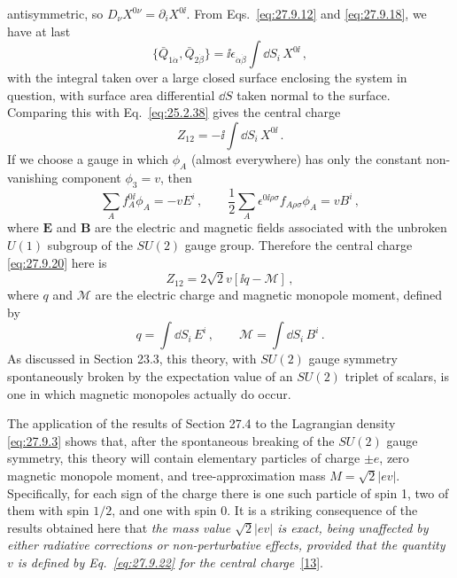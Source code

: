 antisymmetric, so \(D_\nu X^{0\nu}=\partial_iX^{0\ii}\). From
Eqs.~\eqref{eq:27.9.12} and \eqref{eq:27.9.18}, we have at last
\begin{equation}
  \{\bar Q_{1\dot\alpha},\bar Q_{2\dot\beta}\}
  =\ii\epsilon_{\dot\alpha\dot\beta}\int \dd S_i\,X^{0\ii}\,,
  \tag{27.9.19}\label{eq:27.9.19}
\end{equation}
with the integral taken over a large closed surface enclosing the system in
question, with surface area differential \(\dd S\) taken normal to the surface.
Comparing this with Eq.~\eqref{eq:25.2.38} gives the central charge
\begin{equation}
  Z_{12}=-\ii\int \dd S_i\,X^{0\ii}\,.
  \tag{27.9.20}\label{eq:27.9.20}
\end{equation}
If we choose a gauge in which \(\phi_A\) (almost everywhere) has only the
constant non-vanishing component \(\phi_3=v\), then
\begin{equation}
  \sum_Af_A^{0\ii}\phi_A=-vE^i\,,
  \qquad
  \frac12\sum_A\epsilon^{0\ii\rho\sigma}f_{A\rho\sigma}\phi_A=vB^i\,,
  \tag{27.9.21}\label{eq:27.9.21}
\end{equation}
where \(\mathbf{E}\) and \(\mathbf{B}\) are the electric and magnetic fields
associated with the unbroken \(U(1)\) subgroup of the \(SU(2)\) gauge group.
Therefore the central charge \eqref{eq:27.9.20} here is
\begin{equation}
  Z_{12}=2\sqrt{2}v[\ii q-\mathcal{M}]\,,
  \tag{27.9.22}\label{eq:27.9.22}
\end{equation}
where \(q\) and \(\mathcal{M}\) are the electric charge and magnetic monopole
moment, defined by
\begin{equation}
  q=\int \dd S_i\,E^i\,,
  \qquad
  \mathcal{M}=\int \dd S_i\,B^i\,.
  \tag{27.9.23}\label{eq:27.9.23}
\end{equation}
As discussed in Section 23.3, this theory, with \(SU(2)\) gauge symmetry
spontaneously broken by the expectation value of an \(SU(2)\) triplet of
scalars, is one in which magnetic monopoles actually do occur.

The application of the results of Section 27.4 to the Lagrangian density
\eqref{eq:27.9.3} shows that, after the spontaneous breaking of the \(SU(2)\)
gauge symmetry, this theory will contain elementary particles of charge
\(\mathord{\pm}e\), zero magnetic monopole moment, and tree-approximation mass
\(M=\sqrt{2}|ev|\). Specifically, for each sign of the charge there is one
such particle of spin 1, two of them with spin \(1/2\), and one with spin 0.
It is a striking consequence of the results obtained here that \emph{the mass
value \(\sqrt{2}|ev|\) is exact, being unaffected by either radiative
corrections or non-perturbative effects, provided that the quantity \(v\) is
defined by Eq.~\eqref{eq:27.9.22} for the central
charge}~\hyperref[ch27-ref-13]{[13]}.

